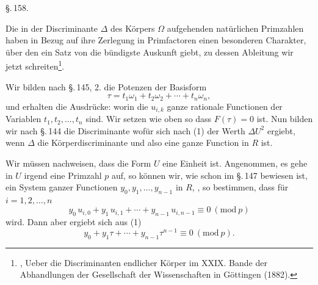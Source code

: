 
\begin{center}
\S.\,158.

\end{center}

Die in der Discriminante $\Delta$ des K\"orpers $\Omega$ aufgehenden natürlichen Primzahlen haben in Bezug auf ihre Zerlegung in Primfactoren einen besonderen Charakter, über den ein Satz von  die bündigste Auskunft giebt, zu dessen Ableitung wir jetzt schreiten\footnote{, \glqq Ueber die Discriminanten endlicher K\"orper\grqq{} im XXIX. Bande der Abhandlungen der Gesellschaft der Wissenschaften in G\"ottingen (1882).}.

Wir bilden nach \S.\,145, 2. die Potenzen der Basisform
\[
\tau = t_1\omega_1 + t_2\omega_2 + \cdots + t_n\omega_n,
\]
und erhalten die Ausdrücke:
worin die $u_{i,k}$ ganze rationale Functionen der Variablen $t_1, t_2, \ldots, t_n$ sind. Wir setzen wie oben
so dass $F(\tau)=0$ ist. Nun bilden wir nach \S.\,144 die Discriminante
wofür sich nach (1) der Werth $\Delta U^2$ ergiebt, wenn $\Delta$ die Körperdiscriminante und
also eine ganze Function in $R$ ist.

Wir müssen nachweisen, dass die Form $U$ eine Einheit ist. Angenommen, es gehe in $U$ irgend eine Primzahl $p$ auf, so können wir, wie schon im \S.\,147 bewiesen ist, ein System ganzer Functionen $y_0, y_1, \ldots, y_{n-1}$ in $R$, , so bestimmen, dass für $i=1,2,\ldots,n$
\[
y_0\, u_{i,0} + y_1\, u_{i,1} + \cdots + y_{n-1}\, u_{i,n-1} \equiv 0\ (\mathrm{mod}\ p)
\]
wird. Dann aber ergiebt sich aus (1)
\[
y_0 + y_1\tau + \cdots + y_{n-1}\tau^{n-1} \equiv 0\ (\mathrm{mod}\ p).
\]
